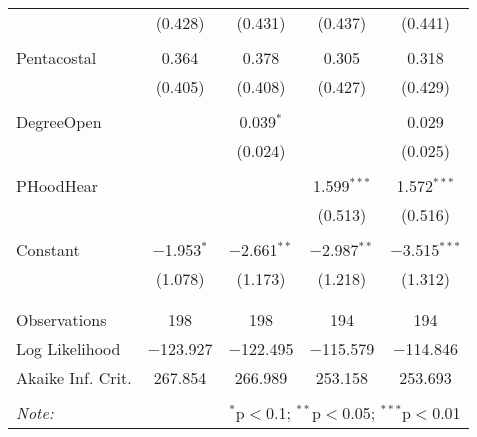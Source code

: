 \begin{table}[H]
\begin{tabular}{@{\extracolsep{5pt}}lcccc}
  & (0.428) & (0.431) & (0.437) & (0.441) \\ 
  & & & & \\ 
 Pentacostal & 0.364 & 0.378 & 0.305 & 0.318 \\ 
  & (0.405) & (0.408) & (0.427) & (0.429) \\ 
  & & & & \\ 
 DegreeOpen &  & 0.039$^{*}$ &  & 0.029 \\ 
  &  & (0.024) &  & (0.025) \\ 
  & & & & \\ 
 PHoodHear &  &  & 1.599$^{***}$ & 1.572$^{***}$ \\ 
  &  &  & (0.513) & (0.516) \\ 
  & & & & \\ 
 Constant & $-$1.953$^{*}$ & $-$2.661$^{**}$ & $-$2.987$^{**}$ & $-$3.515$^{***}$ \\ 
  & (1.078) & (1.173) & (1.218) & (1.312) \\ 
  & & & & \\ 
\hline \\[-1.8ex] 
Observations & 198 & 198 & 194 & 194 \\ 
Log Likelihood & $-$123.927 & $-$122.495 & $-$115.579 & $-$114.846 \\ 
Akaike Inf. Crit. & 267.854 & 266.989 & 253.158 & 253.693 \\ 
\hline 
\hline \\[-1.8ex] 
\textit{Note:}  & \multicolumn{4}{r}{$^{*}$p$<$0.1; $^{**}$p$<$0.05; $^{***}$p$<$0.01} \\ 
\end{tabular} 
\end{table} 

